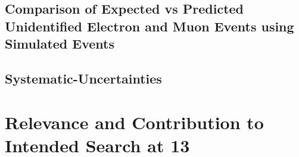 \subsection{Comparison of Expected vs Predicted Unidentified Electron and Muon Events using Simulated Events}
\label{sec:Lost_Lepton_13TeV_Closure}
\subsection{Systematic-Uncertainties}
\label{sec:Lost_Lepton_13TeV_Uncertainties}
\section{Relevance and Contribution to Intended Search at 13 \tev}
\label{sec:Lost_Lepton_13TeV_SUSY_SearchImpact}





